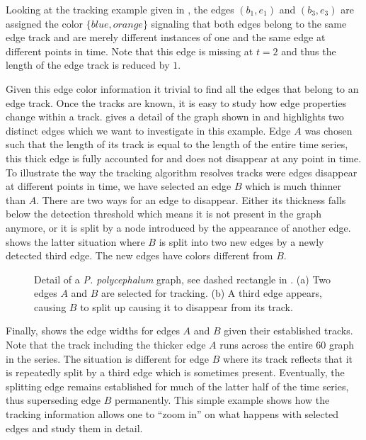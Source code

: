 	Looking at the tracking example given in , the edges $(b_1,e_1)$ and $(b_3,e_3)$ are assigned the color $\{blue, orange\}$ signaling that both edges belong to the same edge track and are merely different instances of one and the same edge at different points in time. Note that this edge is missing at $t=2$ and thus the length of the edge track is reduced by $1$.

	Given this edge color information it trivial to find all the edges that belong to an edge track. Once the tracks are known, it is easy to study how edge properties change within a track.  gives a detail of the graph shown in  and highlights two distinct edges which we want to investigate in this example. Edge $A$ was chosen such that the length of its track is equal to the length of the entire time series, \ie this thick edge is fully accounted for and does not disappear at any point in time. To illustrate the way the tracking algorithm resolves tracks were edges disappear at different points in time, we have selected an edge $B$ which is much thinner than $A$. There are two ways for an edge to disappear. Either its thickness falls below the detection threshold which means it is not present in the graph anymore, or it is split by a node introduced by the appearance of another edge.  shows the latter situation where $B$ is split into two new edges by a newly detected third edge. The new edges have colors different from $B$.

	\begin{figure}
		\centering
		\qquad
		\caption[Demo - Setup for tracking individual edges]{Detail of a \emph{P. polycephalum} graph, see dashed rectangle in . (a) Two edges $A$ and $B$ are selected for tracking. (b) A third edge appears, causing $B$ to split up causing it to disappear from its track.}
		\label{fig:split_examples}
    \end{figure}

    Finally,  shows the edge widths for edges $A$ and $B$ given their established tracks. Note that the track including the thicker edge $A$ runs across the entire $60$ graph in the series. The situation is different for edge $B$ where its track reflects that it is repeatedly split by a third edge which is sometimes present. Eventually, the splitting edge remains established for much of the latter half of the time series, thus superseding edge $B$ permanently. This simple example shows how the tracking information allows one to ``zoom in'' on what happens with selected edges and study them in detail.


